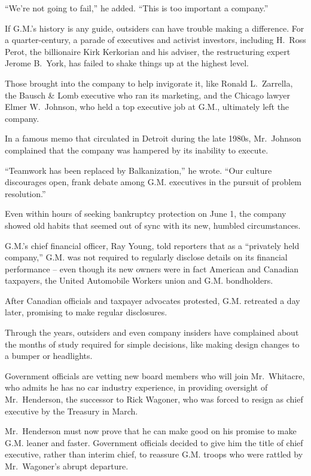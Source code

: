 ﻿\documentclass[12pt,a4paper,onecolumn]{article}
\begin{document}
``We're not going to fail,'' he added. ``This is too important a company.''

If G.M.'s history is any guide, outsiders can have trouble making a difference. For a
quarter-century, a parade of executives and activist investors, including H.~Ross Perot, the
billionaire Kirk Kerkorian and his adviser, the restructuring expert Jerome B.~York, has failed to
shake things up at the highest level.

Those brought into the company to help invigorate it, like Ronald L.~Zarrella, the Bausch \& Lomb
executive who ran its marketing, and the Chicago lawyer Elmer W.~Johnson, who held a top executive
job at G.M., ultimately left the company.

In a famous memo that circulated in Detroit during the late 1980s, Mr.~Johnson complained that the
company was hampered by its inability to execute.

``Teamwork has been replaced by Balkanization,'' he wrote. ``Our culture discourages open, frank
debate among G.M. executives in the pursuit of problem resolution.''

Even within hours of seeking bankruptcy protection on June 1, the company showed old habits that
seemed out of sync with its new, humbled circumstances.

G.M.'s chief financial officer, Ray Young, told reporters that as a ``privately held company,'' G.M.
was not required to regularly disclose details on its financial performance -- even though its new
owners were in fact American and Canadian taxpayers, the United Automobile Workers union and G.M.
bondholders.

After Canadian officials and taxpayer advocates protested, G.M. retreated a day later, promising to
make regular disclosures.

Through the years, outsiders and even company insiders have complained about the months of study
required for simple decisions, like making design changes to a bumper or headlights.

Government officials are vetting new board members who will join Mr.~Whitacre, who admits he has no
car industry experience, in providing oversight of Mr.~Henderson, the successor to Rick Wagoner, who
was forced to resign as chief executive by the Treasury in March.

Mr.~Henderson must now prove that he can make good on his promise to make G.M. leaner and faster.
Government officials decided to give him the title of chief executive, rather than interim chief, to
reassure G.M. troops who were rattled by Mr.~Wagoner's abrupt departure.
\end{document}
